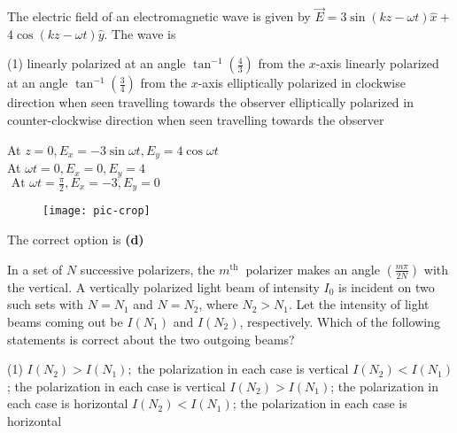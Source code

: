 \begin{enumerate}
\begin{minipage}{\textwidth}
	\item The electric field of an electromagnetic wave is given by $\vec{E}=3 \sin (k z-\omega t) \hat{x}+$ $4 \cos (k z-\omega t) \hat{y}$. The wave is
\end{minipage}
\begin{tasks}(1)
	\task[\textbf{A.}] linearly polarized at an angle $\tan ^{-1}\left(\frac{4}{3}\right)$ from the $x$-axis
	\task[\textbf{B.}]linearly polarized at an angle $\tan ^{-1}\left(\frac{3}{4}\right)$ from the $x$-axis
	\task[\textbf{C.}] elliptically polarized in clockwise direction when seen travelling towards the observer
	\task[\textbf{D.}] elliptically polarized in counter-clockwise direction when seen travelling towards the observer
\end{tasks}
\begin{answer}
	At $z=0, E_{x}=-3 \sin \omega t, E_{y}=4 \cos \omega t$\\
	At $\omega t=0, E_{x}=0, E_{y}=4$\\
	$\text { At } \omega t=\frac{\pi}{2}, E_{x}=-3, E_{y}=0	$\\
	\begin{figure}[H]
		\centering
		\texttt{[image: pic-crop]}
	\end{figure}
	The correct option is \textbf{(d)}
\end{answer}
\begin{minipage}{\textwidth}
	\item In a set of $N$ successive polarizers, the $m^{\text {th }}$ polarizer makes an angle $\left(\frac{m \pi}{2 N}\right)$ with the vertical. A vertically polarized light beam of intensity $I_{0}$ is incident on two such sets with $N=N_{1}$ and $N=N_{2}$, where $N_{2}>N_{1} .$ Let the intensity of light beams coming out be $I\left(N_{1}\right)$ and $I\left(N_{2}\right)$, respectively. Which of the following statements is correct about the two outgoing beams?
\end{minipage}
\begin{tasks}(1)
	\task[\textbf{A.}] $I\left(N_{2}\right)>I\left(N_{1}\right) ;$ the polarization in each case is vertical
	\task[\textbf{B.}]$I\left(N_{2}\right)<I\left(N_{1}\right)$; the polarization in each case is vertical
	\task[\textbf{C.}]$I\left(N_{2}\right)>I\left(N_{1}\right)$; the polarization in each case is horizontal
	\task[\textbf{D.}]$I\left(N_{2}\right)<I\left(N_{1}\right)$; the polarization in each case is horizontal

\end{tasks}
\end{enumerate}
